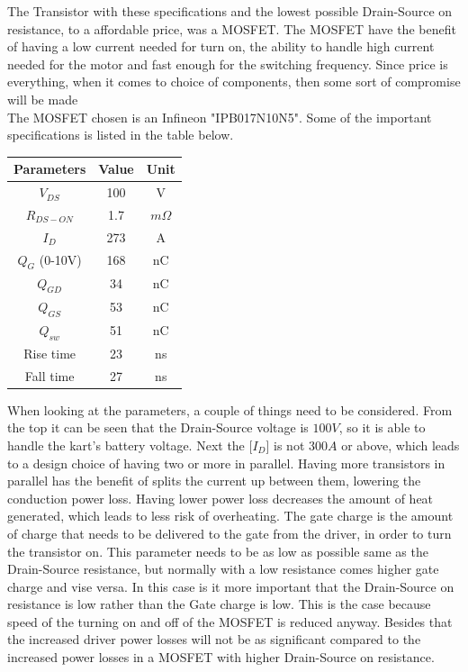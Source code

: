 The Transistor with these specifications and the lowest possible Drain-Source on resistance, to a affordable price, was a MOSFET. The MOSFET have the benefit of having a low current needed for turn on, the ability to handle high current needed for the motor and fast enough for the switching frequency. Since price is everything, when it comes to choice of components, then some sort of compromise will be made \\

The MOSFET chosen is an Infineon "IPB017N10N5". Some of the important specifications is listed in the table below.
\begin{center}
 \begin{tabular}{|c|c|c|} 
 \hline
 Parameters & Value & Unit \\
 \hline
 $V_{DS}$ & 100 & V \\  
 \hline
 $R_{DS-ON}$ & 1.7 & $m\Omega$ \\
 \hline
 $I_D$ & 273 & A \\
 \hline
 $Q_G$ (0-10V) & 168 & nC \\
 \hline
 $Q_{GD}$ & 34 & nC \\
 \hline
 $Q_{GS}$ & 53 & nC \\
 \hline
 $Q_{sw}$ & 51 & nC \\
 \hline
 Rise time & 23 & ns \\
 \hline
 Fall time & 27 & ns \\
 \hline
\end{tabular}
\end{center}

When looking at the parameters, a couple of things need to be considered. From the top it can be seen that the Drain-Source voltage is $100 V$, so it is able to handle the kart's battery voltage. Next the  [$I_D$] is not $300 A$ or above, which leads to a design choice of having two or more in parallel. Having more transistors in parallel has the benefit of splits the current up between them, lowering the conduction power loss. Having lower power loss decreases the amount of heat generated, which leads to less risk of overheating. The gate charge is the amount of charge that needs to be delivered to the gate from the driver, in order to turn the transistor on. This parameter needs to be as low as possible same as the Drain-Source resistance, but normally with a low resistance comes higher gate charge and vise versa. In this case is it more important that the Drain-Source on resistance is low rather than the Gate charge is low. This is the case because speed of the turning on and off of the MOSFET is reduced anyway. Besides that the increased driver power losses will not be as significant compared to the increased power losses in a MOSFET with higher Drain-Source on resistance.\\ 


